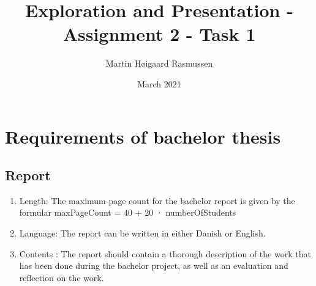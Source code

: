 \documentclass{article}
\title{Exploration and Presentation - Assignment 2 - Task 1}
\author{Martin Høigaard Rasmussen }
\date{March 2021}
\begin{document}
\maketitle

\section{Requirements of bachelor thesis}

\subsection{Report \cite{bachelorProject}}
\begin{enumerate}
    \item Length: The maximum page count for the bachelor report is given by
the formular maxPageCount = 40 + 20 · numberOfStudents
 
    \item Language: The report can be written in either Danish or English.
    \item Contents : The report should contain a thorough description of the work that
has been done during the bachelor project, as well as an evaluation and reflection
on the work.
\end{enumerate}
\end{document}
